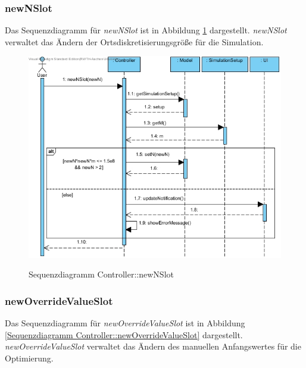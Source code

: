\subsubsection*{newNSlot}

Das Sequenzdiagramm für \emph{newNSlot} ist in Abbildung \ref{Sequenzdiagramm Controller::newNSlot} dargestellt. \emph{newNSlot} verwaltet das Ändern der Ortsdiskretisierungsgröße für die Simulation.

\begin{figure}[H]
	\centering
	\includegraphics[scale=.55]{Bilder/Controller__newNSlot().jpg}\\
	\caption{Sequenzdiagramm Controller::newNSlot}
	\label{Sequenzdiagramm Controller::newNSlot}
\end{figure}

\subsubsection*{newOverrideValueSlot}

Das Sequenzdiagramm für \emph{newOverrideValueSlot} ist in Abbildung \ref{Sequenzdiagramm Controller::newOverrideValueSlot} dargestellt. \emph{newOverrideValueSlot} verwaltet das Ändern des manuellen Anfangswertes für die Optimierung.

